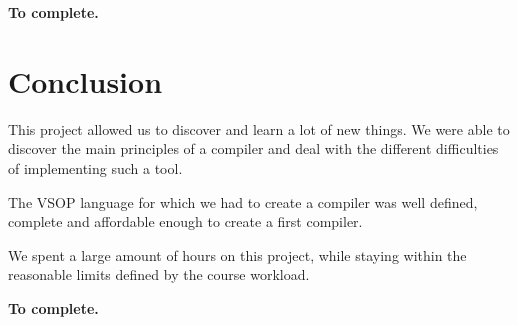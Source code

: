 \documentclass[a4paper, 12pt]{article}
\begin{document}
    {\bf To complete.}
    
    
    \section{Conclusion}
    
    This project allowed us to discover and learn a lot of new things. We were able to discover the main principles of a compiler and deal with the different difficulties of implementing such a tool.
    
    The VSOP language for which we had to create a compiler was well defined, complete and affordable enough to create a first compiler.
    
    We spent a large amount of hours on this project, while staying within the reasonable limits defined by the course workload.
    
    {\bf To complete.}
\end{document}
